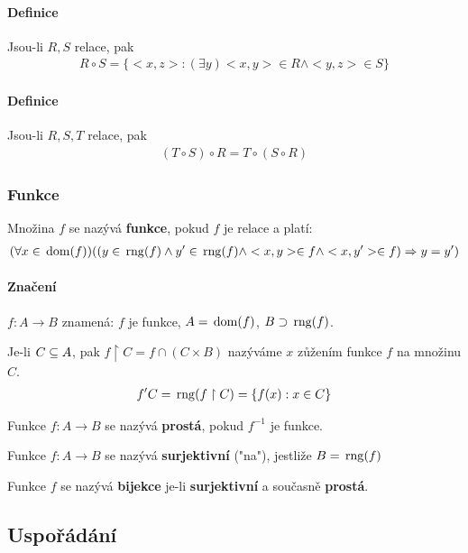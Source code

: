 \documentclass[a4paper,12pt,titlepage]{article}
\begin{document}
\paragraph{Definice}
Jsou-li $R, S$ relace, pak
\begin{align}
R \circ S = \{ <x,z> : (\exists y) <x,y> \in R \land <y,z> \in S \}
\end{align}
\paragraph{Definice}
Jsou-li $R, S, T$ relace, pak
\begin{align}
	(T \circ S) \circ R = T \circ (S \circ R)
\end{align}

\subsubsection{Funkce}
\setcounter{equation}{0}
Množina $f$ se nazývá \textbf{funkce}, pokud $f$ je relace a platí:
\begin{align}
	(\forall x \in \operatorname*{\,dom}(f))((y \in \operatorname*{\,rng}(f) \land y' \in \operatorname*{\,rng}(f) \land <x,y> \in f
	\land <x,y'> \in f) \Rightarrow y = y')
\end{align}
\paragraph{Značení} $f: A \to B$ znamená: $f$ je funkce, $A = \operatorname*{\,dom}(f)$, $B \supset
\operatorname*{\,rng}(f)$.


Je-li $C \subseteq A$, pak $f \upharpoonright C = f \cap (C \times B)$ nazýváme $x$ zůžením funkce
$f$ na množinu $C$.
\begin{align}
f'C = \operatorname*{\,rng}(f \upharpoonright C) = \{ f(x): x \in C \}
\end{align}
\begin{description}
\item Funkce $f: A \to B$ se nazývá \textbf{prostá}, pokud $f^{-1}$ je funkce.
\item Funkce $f: A \to B$ se nazývá \textbf{surjektivní} ("na"), jestliže $B = \operatorname*{\,rng}(f)$
\item Funkce $f$ se nazývá \textbf{bijekce} je-li \textbf{surjektivní} a současně
\textbf{prostá}.
\end{description}


\subsection{Uspořádání}
\setcounter{equation}{0}
\end{document}
